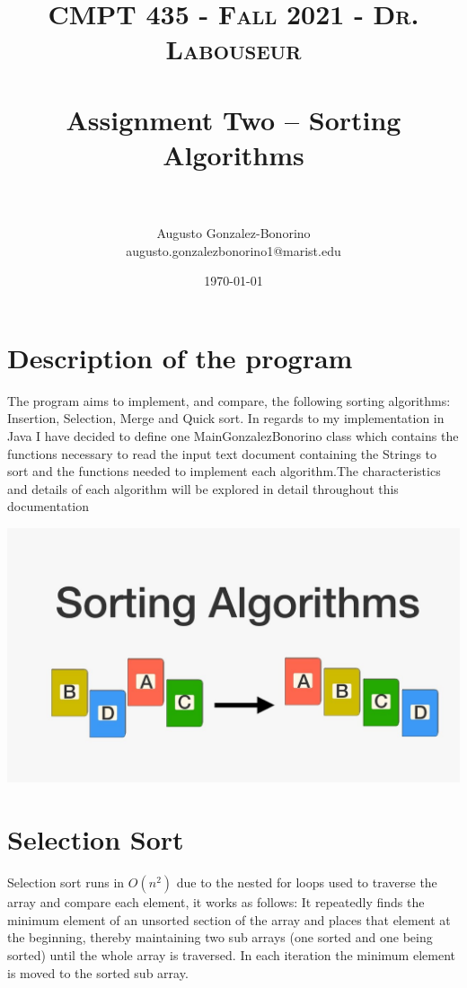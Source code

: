 \documentclass[letterpaper, 10pt]{article}
\title{	
   \normalfont \normalsize 
   \textsc{CMPT 435 - Fall 2021 - Dr. Labouseur} \\[10pt] %
   \horrule{0.5pt} \\[0.25cm] 	%
   \huge Assignment Two -- Sorting Algorithms \\     	    %
   \horrule{0.5pt} \\[0.25cm] 	%
}
\author{Augusto Gonzalez-Bonorino \\ \normalsize augusto.gonzalezbonorino1@marist.edu}
\date{\normalsize\today} 	%
\begin{document}
\maketitle %



\section{Description of the program}
The program aims to implement, and compare, the following sorting algorithms: Insertion, Selection, Merge and Quick sort. In regards to my implementation in Java I have decided to define one MainGonzalezBonorino class which contains the functions necessary to read the input text document containing the Strings to sort and the functions needed to implement each algorithm.The characteristics and details of each algorithm will be explored in detail throughout this documentation


\includegraphics[scale=0.25]{images/sorting_algorithms.jpg}

\pagebreak
\section{Selection Sort}

Selection sort runs in $O(n^2)$ due to the nested for loops used to traverse the array and compare each element, it works as follows: It repeatedly finds the minimum element of an unsorted section of the array and places that element at the beginning, thereby maintaining two sub arrays (one sorted and one being sorted) until the whole array is traversed. In each iteration the minimum element is moved to the sorted sub array. 
\end{document}
